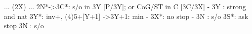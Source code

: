 ... (2X) ...
2N*->3C*: s/o in 3Y [P/3Y]; or CoG/ST in C [3C/3X]
   - 3Y : strong and nat
3Y*: inv+, (4)5+[Y+1]
   ->3Y+1: min
   - 3X*: no stop
   - 3N : s/o
3S*: ask stop
3N : s/o